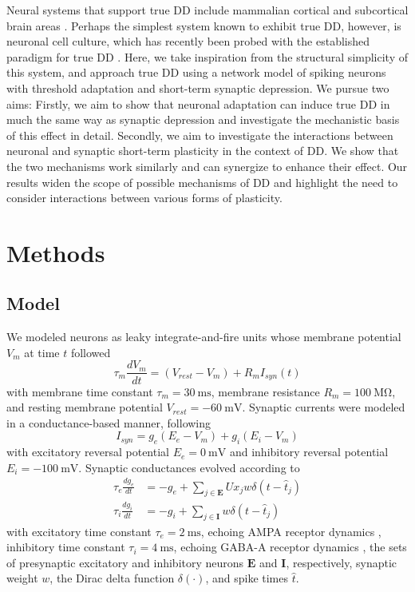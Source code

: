 \documentclass[10pt,letterpaper]{article}
\begin{document}
Neural systems that support true DD include mammalian cortical and subcortical brain areas \cite{Carbajal2018-sd, Parras2017-fp, Grimm2012-tb}. Perhaps the simplest system known to exhibit true DD, however, is neuronal cell culture, which has recently been probed with the established paradigm for true DD \cite{Kubota2021-dx}. Here, we take inspiration from the structural simplicity of this system, and approach true DD using a network model of spiking neurons with threshold adaptation and short-term synaptic depression. We pursue two aims: Firstly, we aim to show that neuronal adaptation can induce true DD in much the same way as synaptic depression and investigate the mechanistic basis of this effect in detail. Secondly, we aim to investigate the interactions between neuronal and synaptic short-term plasticity in the context of DD. We show that the two mechanisms work similarly and can synergize to enhance their effect. Our results widen the scope of possible mechanisms of DD and highlight the need to consider interactions between various forms of plasticity.

\section*{Methods}
\subsection*{Model}

We modeled neurons as leaky integrate-and-fire units whose membrane potential $V_m$ at time $t$ followed
\begin{equation}
    \tau_m \frac{dV_m}{dt} = (V_{rest}-V_m) + R_m I_{syn}(t)
\end{equation}
with membrane time constant $\tau_m = \qty{30}{\milli\second}$, membrane resistance $R_m = \qty{100}{\mega\ohm}$, and resting membrane potential $V_{rest} = \qty{-60}{\milli\volt}$. Synaptic currents were modeled in a conductance-based manner, following
\begin{equation}
    I_{syn} = g_e(E_e-V_m) + g_i(E_i-V_m)
\end{equation}
with excitatory reversal potential $E_e = \qty{0}{\milli\volt}$ and inhibitory reversal potential $E_i = \qty{-100}{\milli\volt}$. Synaptic conductances evolved according to
\begin{align} 
    \tau_e \frac{dg_e}{dt} &= -g_e + \sum_{j \in \boldsymbol E} U x_j w \delta(t - \hat{t}_j) \nonumber \\
    \tau_i \frac{dg_i}{dt} &= -g_i + \sum_{j \in \boldsymbol I} w \delta(t - \hat{t}_j) \label{eq:gsyn}
\end{align}
with excitatory time constant $\tau_e = \qty{2}{\milli\second}$, echoing AMPA receptor dynamics \cite{Hausser1997-cn}, inhibitory time constant $\tau_i = \qty{4}{\milli\second}$, echoing GABA-A receptor dynamics \cite{Destexhe1994-oc}, the sets of presynaptic excitatory and inhibitory neurons $\boldsymbol E$ and $\boldsymbol I$, respectively, synaptic weight $w$, the Dirac delta function $\delta(\cdot)$, and spike times $\hat{t}$.
\end{document}
